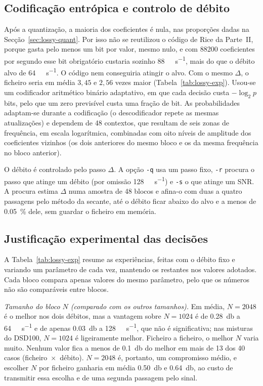 \documentclass[a4paper,11pt]{article}
\begin{document}
\subsection{Codificação entrópica e controlo de débito}
\label{sec:lossy-ent}
Após a quantização, a maioria dos coeficientes é nula, nas proporções dadas na
Secção~\ref{sec:lossy-quant}. Por isso não se reutilizou o código de Rice da Parte~II, porque gasta pelo menos um bit
por valor, mesmo nulo, e com \num{88200} coeficientes por segundo esse bit
obrigatório custaria sozinho \SI{88}{\kilo\bit\per\second}, mais do que o débito
alvo de \SI{64}{\kilo\bit\per\second}. O código nem conseguiria atingir o alvo.
Com o mesmo $\Delta$, o ficheiro seria em média $3{,}45$ e $2{,}56$ vezes maior
(Tabela~\ref{tab:lossy-exp}). Usou-se um codificador aritmético binário
adaptativo, em que cada decisão custa $-\log_2 p$ bits, pelo que um zero previsível custa
uma fração de bit. As probabilidades adaptam-se durante a codificação (o
descodificador repete as mesmas atualizações) e dependem de 48 contextos, que
resultam de seis zonas de frequência, em escala logarítmica, combinadas com oito níveis de
amplitude dos coeficientes vizinhos (os dois anteriores do mesmo bloco e os da
mesma frequência no bloco anterior).

O débito é controlado pelo passo $\Delta$. A opção \texttt{-q} usa um passo fixo,
\texttt{-r} procura o passo que atinge um débito (por omissão
\SI{128}{\kilo\bit\per\second}) e \texttt{-s} o que atinge um SNR. A procura estima
$\Delta$ numa amostra de 48 blocos e afina-o com duas a quatro passagens pelo
método da secante, até o débito ficar abaixo do alvo e a menos de
\SI{0,05}{\percent} dele, sem guardar o ficheiro em memória.


\subsection{Justificação experimental das decisões}
\label{sec:lossy-exp}
A Tabela~\ref{tab:lossy-exp} resume as experiências, feitas com o débito fixo e
variando um parâmetro de cada vez, mantendo os restantes nos valores adotados.
Cada bloco compara apenas valores do mesmo parâmetro, pelo que os números não são
comparáveis entre blocos.

\emph{Tamanho do bloco $N$ (comparado com os outros tamanhos).} Em média, $N=2048$
é o melhor nos dois débitos, mas a vantagem sobre $N=1024$ é de
\SI{0,28}{\decibel} a \SI{64}{\kilo\bit\per\second} e de apenas
\SI{0,03}{\decibel} a \SI{128}{\kilo\bit\per\second}, que não é significativa;
nas misturas do DSD100, $N=1024$ é ligeiramente melhor. Ficheiro a ficheiro, o
melhor $N$ varia muito. Nenhum valor fica a menos de \SI{0,1}{\decibel} do melhor
em mais de 13 dos 40 casos (ficheiro~$\times$~débito). $N=2048$ é, portanto, um
compromisso médio, e escolher $N$ por ficheiro ganharia em média
\SI{0,50}{\decibel} e \SI{0,64}{\decibel}, ao custo de transmitir essa
escolha e de uma segunda passagem pelo sinal.
\end{document}
